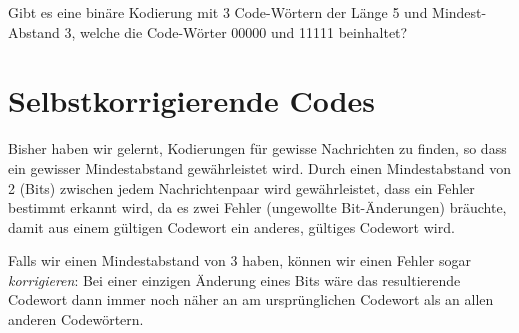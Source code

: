 \begin{mychallenge}
    Gibt es eine binäre Kodierung mit 3 Code-Wörtern der Länge 5 und Mindest-Abstand 3, welche die Code-Wörter 00000 und 11111 beinhaltet?
\end{mychallenge}



\section{Selbstkorrigierende Codes}

Bisher haben wir gelernt, Kodierungen für gewisse Nachrichten zu finden, so dass ein gewisser Mindestabstand gewährleistet wird. Durch einen Mindestabstand von 2 (Bits) zwischen jedem Nachrichtenpaar wird gewährleistet, dass ein Fehler bestimmt erkannt wird, da es zwei Fehler (ungewollte Bit-Änderungen) bräuchte, damit aus einem gültigen Codewort ein anderes, gültiges Codewort wird.

Falls wir einen Mindestabstand von 3 haben, können wir einen Fehler sogar \textit{korrigieren}: Bei einer einzigen Änderung eines Bits wäre das resultierende Codewort dann immer noch näher an am ursprünglichen Codewort als an allen anderen Codewörtern.

